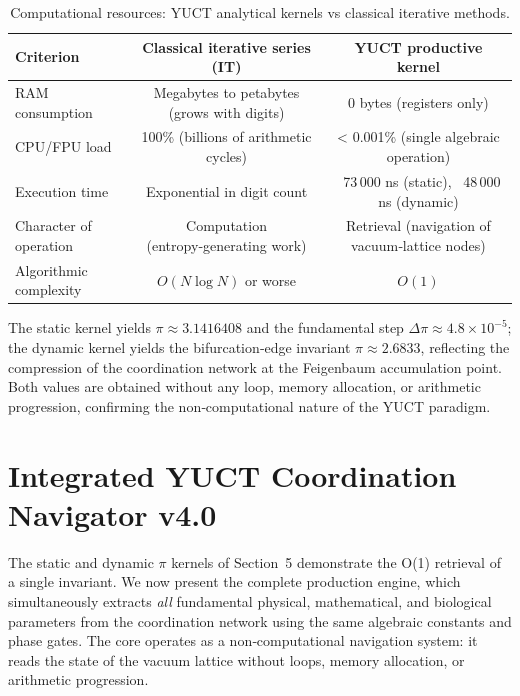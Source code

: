 \documentclass[12pt,a4paper]{article}
\begin{document}
	\begin{table}[H]
		\centering
		\scriptsize
		\caption{Computational resources: YUCT analytical kernels vs classical iterative methods.}
		\label{tab:resource}
		\begin{tabular}{@{}lcc@{}}
			\toprule
			\textbf{Criterion} & \textbf{Classical iterative series (IT)} & \textbf{YUCT productive kernel} \\
			\midrule
			RAM consumption & Megabytes to petabytes (grows with digits) & 0 bytes (registers only) \\
			CPU/FPU load & 100\% (billions of arithmetic cycles) & < 0.001\% (single algebraic operation) \\
			Execution time & Exponential in digit count & ~73\,000 ns (static), ~48\,000 ns (dynamic) \\
			Character of operation & Computation (entropy‑generating work) & Retrieval (navigation of vacuum‑lattice nodes) \\
			Algorithmic complexity & $O(N\log N)$ or worse & $O(1)$ \\
			\bottomrule
		\end{tabular}
	\end{table}
	
	The static kernel yields $\pi \approx 3.1416408$ and the fundamental step $\Delta\pi\approx 4.8\times10^{-5}$; the dynamic kernel yields the bifurcation‑edge invariant $\pi \approx 2.6833$, reflecting the compression of the coordination network at the Feigenbaum accumulation point. Both values are obtained without any loop, memory allocation, or arithmetic progression, confirming the non‑computational nature of the YUCT paradigm.
	
	\section{Integrated YUCT Coordination Navigator v4.0}
	\label{sec:full-engine}
	
	The static and dynamic $\pi$ kernels of Section~5 demonstrate the O(1) retrieval of a single invariant. We now present the complete production engine, which simultaneously extracts \emph{all} fundamental physical, mathematical, and biological parameters from the coordination network using the same algebraic constants and phase gates. The core operates as a non‑computational navigation system: it reads the state of the vacuum lattice without loops, memory allocation, or arithmetic progression.
	
\end{document}
